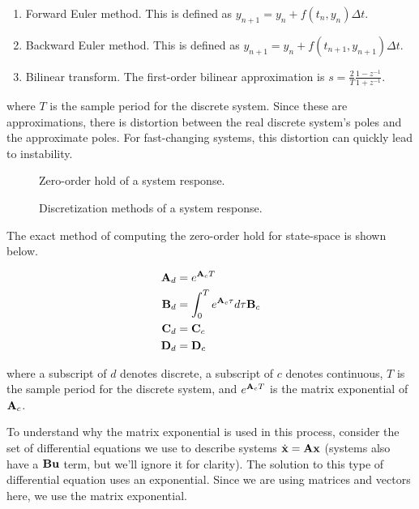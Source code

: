 \begin{enumerate}
  \item Forward Euler method. This is defined as
    $y_{n+1} = y_n + f(t_n, y_n) \Delta t$.
  \item Backward Euler method. This is defined as
    $y_{n+1} = y_n + f(t_{n+1}, y_{n+1}) \Delta t$.
  \item Bilinear transform. The first-order bilinear approximation is
    $s = \frac{2}{T} \frac{1 - z^{-1}}{1 + z^{-1}}$.
\end{enumerate}

where $T$ is the sample period for the discrete system. Since these are
approximations, there is distortion between the real discrete system's poles and
the approximate poles. For fast-changing systems, this distortion can quickly
lead to instability.

\begin{figure}[H]
  \def\svgwidth{\linewidth}
  
  \caption{Zero-order hold of a system response.}
\end{figure}

\begin{figure}[H]
  \def\svgwidth{\linewidth}
  
  \caption{Discretization methods of a system response.}
\end{figure}

The exact method of computing the zero-order hold for state-space is shown
below.

\begin{theorem}
  \begin{align}
    \mathbf{A}_d &= e^{\mathbf{A}_c T} \\
    \mathbf{B}_d &= \int_0^T e^{\mathbf{A}_c \tau} d\tau \mathbf{B}_c \\
    \mathbf{C}_d &= \mathbf{C}_c \\
    \mathbf{D}_d &= \mathbf{D}_c
  \end{align}

  where a subscript of $d$ denotes discrete, a subscript of $c$ denotes
  continuous, $T$ is the sample period for the discrete system, and
  $e^{\mathbf{A}_c T}$ is the matrix exponential of $\mathbf{A}_c$.
\end{theorem}

To understand why the matrix exponential is used in this process, consider the
set of differential equations we use to describe systems
$\dot{\mathbf{x}} = \mathbf{A}\mathbf{x}$ (systems also have a $\mathbf{B}\mathbf{u}$ term, but
we'll ignore it for clarity). The solution to this type of differential equation
uses an exponential. Since we are using matrices and vectors here, we use the
matrix exponential.

